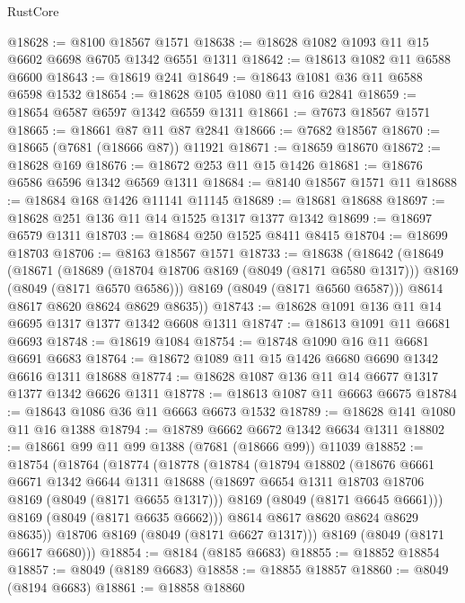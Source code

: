 \begin{lexlean}{RustCore}
\begin{coremodule}
@18628 := @8100 @18567 @1571
@18638 := @18628 @1082 @1093 @11 @15 @6602 @6698 @6705 @1342 @6551 @1311
@18642 := @18613 @1082 @11 @6588 @6600
@18643 := @18619 @241
@18649 := @18643 @1081 @36 @11 @6588 @6598 @1532
@18654 := @18628 @105 @1080 @11 @16 @2841
@18659 := @18654 @6587 @6597 @1342 @6559 @1311
@18661 := @7673 @18567 @1571
@18665 := @18661 @87 @11 @87 @2841
@18666 := @7682 @18567
@18670 := @18665 (@7681 (@18666 @87)) @11921
@18671 := @18659 @18670
@18672 := @18628 @169
@18676 := @18672 @253 @11 @15 @1426
@18681 := @18676 @6586 @6596 @1342 @6569 @1311
@18684 := @8140 @18567 @1571 @11
@18688 := @18684 @168 @1426 @11141 @11145
@18689 := @18681 @18688
@18697 := @18628 @251 @136 @11 @14 @1525 @1317 @1377 @1342
@18699 := @18697 @6579 @1311
@18703 := @18684 @250 @1525 @8411 @8415
@18704 := @18699 @18703
@18706 := @8163 @18567 @1571
@18733 := @18638
    (@18642
      (@18649
        (@18671
          (@18689
            (@18704 @18706 @8169 (@8049 (@8171 @6580 @1317)))
            @8169
            (@8049 (@8171 @6570 @6586)))
          @8169
          (@8049 (@8171 @6560 @6587)))
        @8614
        @8617
        @8620
        @8624
        @8629
        @8635))
@18743 := @18628 @1091 @136 @11 @14 @6695 @1317 @1377 @1342 @6608 @1311
@18747 := @18613 @1091 @11 @6681 @6693
@18748 := @18619 @1084
@18754 := @18748 @1090 @16 @11 @6681 @6691 @6683
@18764 := @18672 @1089 @11 @15 @1426 @6680 @6690 @1342 @6616 @1311 @18688
@18774 := @18628 @1087 @136 @11 @14 @6677 @1317 @1377 @1342 @6626 @1311
@18778 := @18613 @1087 @11 @6663 @6675
@18784 := @18643 @1086 @36 @11 @6663 @6673 @1532
@18789 := @18628 @141 @1080 @11 @16 @1388
@18794 := @18789 @6662 @6672 @1342 @6634 @1311
@18802 := @18661 @99 @11 @99 @1388 (@7681 (@18666 @99)) @11039
@18852 := @18754
    (@18764
      (@18774
        (@18778
          (@18784
            (@18794
              @18802
              (@18676
                @6661
                @6671
                @1342
                @6644
                @1311
                @18688
                (@18697 @6654 @1311 @18703 @18706 @8169 (@8049 (@8171 @6655 @1317)))
                @8169
                (@8049 (@8171 @6645 @6661)))
              @8169
              (@8049 (@8171 @6635 @6662)))
            @8614
            @8617
            @8620
            @8624
            @8629
            @8635))
        @18706
        @8169
        (@8049 (@8171 @6627 @1317)))
      @8169
      (@8049 (@8171 @6617 @6680)))
@18854 := @8184 (@8185 @6683)
@18855 := @18852 @18854
@18857 := @8049 (@8189 @6683)
@18858 := @18855 @18857
@18860 := @8049 (@8194 @6683)
@18861 := @18858 @18860

\end{coremodule}
\end{lexlean}
